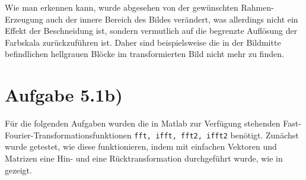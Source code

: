 Wie man erkennen kann, wurde abgesehen von der gewünschten Rahmen-Erzeugung
auch der innere Bereich des Bildes verändert, was allerdings nicht ein Effekt der
Beschneidung ist, sondern vermutlich auf die begrenzte Auflösung der Farbskala 
zurückzuführen ist. Daher sind beispielsweise die in der Bildmitte befindlichen
hellgrauen Blöcke im transformierten Bild nicht mehr zu finden. 

\section*{Aufgabe 5.1b)}
Für die folgenden Aufgaben wurden die in Matlab zur Verfügung stehenden 
Fast-Fourier-Transformationsfunktionen \texttt{fft, ifft, fft2, ifft2} benötigt.
Zunächst wurde getestet, wie diese funktionieren, indem mit einfachen Vektoren und
Matrizen eine Hin- und eine Rücktransformation durchgeführt wurde, wie in 
 gezeigt.


